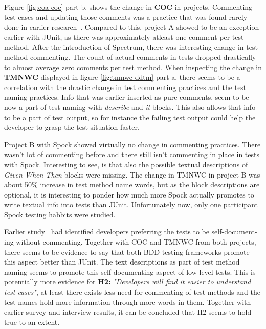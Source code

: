 Figure \ref{fig:coa-coc} part b. shows the change in \textbf{COC} in projects. Commenting test cases and updating those
comments was a practice that was found rarely done in earlier research~\cite{li2016automatically}. Compared to this,
project A showed to be an exception earlier with JUnit, as there was approximately atleast one comment per test method.
After the introduction of Spectrum, there was interesting change in test method commenting. The count of actual comments
in tests dropped drastically to almost average zero comments per test method. When inspecting the change in \textbf{TMNWC}
displayed in figure \ref{fig:tmnwc-ddtm} part a, there seems to be a correlation with the drastic change in test commenting
practices and the test naming practices. Info that was earlier inserted as pure comments, seem to be now a part of test
naming with \textit{describe} and \textit{it} blocks. This also allows that info to be a part of test output, so for instance
the failing test output could help the developer to grasp the test situation faster.

Project B with Spock showed virtually no change in commenting practices. There wasn't lot of commenting before and there still isn't
commenting in place in tests with Spock. Interesting to see, is that also the possible textual descriptions of \textit{Given-When-Then} blocks
were missing. The change in TMNWC in project B was about 50\% increase in test method name words, but as the block descriptions
are optional, it is interesting to ponder how much more Spock actually promotes to write textual info into tests than
JUnit. Unfortunately now, only one participant Spock testing habbits were studied.

Earlier study~\cite{li2016automatically} had identified developers preferring the tests to be self-document- ing without commenting.
Together with COC and TMNWC from both projects, there seems to be evidence to say that both BDD testing frameworks
promote this aspect better than JUnit. The text descriptions as part of test method naming seems to promote this self-documenting
aspect of low-level tests. This is potentially more evidence for \textbf{H2:} \textit{"Developers will find it easier to understand test cases"}, at least
there exists less need for commenting of test methods and the test names hold more information through more words in them.
Together with earlier survey and interview results, it can be concluded that H2 seems to hold true to an extent.

